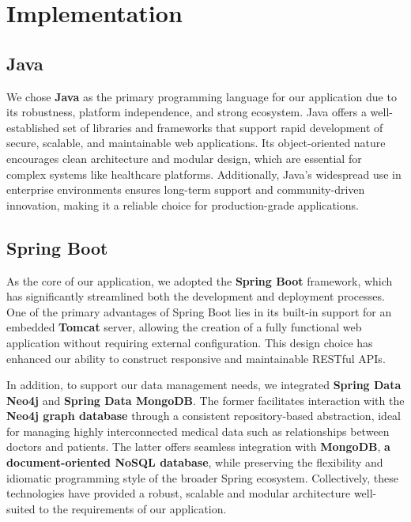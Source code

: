 \chapter{Implementation}
\section{Java}
We chose \textbf{Java} as the primary programming language for our application due to its robustness, platform independence, and strong ecosystem. Java offers a well-established set of libraries and frameworks that support rapid development of secure, scalable, and maintainable web applications. Its object-oriented nature encourages clean architecture and modular design, which are essential for complex systems like healthcare platforms. Additionally, Java's widespread use in enterprise environments ensures long-term support and community-driven innovation, making it a reliable choice for production-grade applications.

\section{Spring Boot}
As the core of our application, we adopted the \textbf{Spring Boot} framework, which has significantly streamlined both the development and deployment processes. One of the primary advantages of Spring Boot lies in its built-in support for an embedded \textbf{Tomcat} server, allowing the creation of a fully functional web application without requiring external configuration. This design choice has enhanced our ability to construct responsive and maintainable RESTful APIs. 

In addition, to support our data management needs, we integrated \textbf{Spring Data Neo4j} and \textbf{Spring Data MongoDB}. The former facilitates interaction with the \textbf{Neo4j graph database} through a consistent repository-based abstraction, ideal for managing highly interconnected medical data such as relationships between doctors and patients. The latter offers seamless integration with \textbf{MongoDB}, \textbf{a document-oriented NoSQL database}, while preserving the flexibility and idiomatic programming style of the broader Spring ecosystem. Collectively, these technologies have provided a robust, scalable and modular architecture well-suited to the requirements of our application. 




